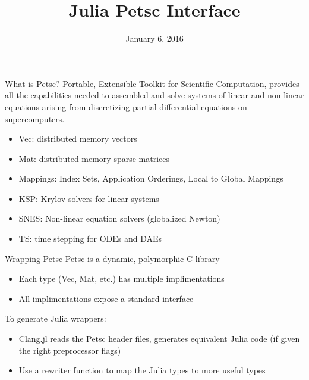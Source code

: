 \documentclass{beamer}
\title{Julia Petsc Interface}
\date{January 6, 2016}
\begin{document}
\begin{frame}
\titlepage
\end{frame}

\begin{frame}{What is Petsc?}
Portable, Extensible Toolkit for Scientific Computation, provides all the 
capabilities needed to assembled and solve systems of linear and non-linear 
equations
arising from discretizing partial differential equations on supercomputers.
\begin{itemize}
  \item Vec: distributed memory vectors
  \item Mat: distributed memory sparse matrices
  \item Mappings: Index Sets, Application Orderings, Local to Global Mappings
  \item KSP: Krylov solvers for linear systems
  \item SNES: Non-linear equation solvers (globalized Newton)
  \item TS: time stepping for ODEs and DAEs
\end{itemize}
\end{frame}


\begin{frame}{Wrapping Petsc}
Petsc is a dynamic, polymorphic C library 
\begin{itemize}
  \item Each type (Vec, Mat, etc.) has multiple implimentations
  \item All implimentations expose a standard interface
\end{itemize}
\hfill

To generate Julia wrappers:
\begin{itemize}
  \item Clang.jl reads the Petsc header files, generates equivalent Julia code (if given the right preprocessor flags)
  \item Use a rewriter function to map the Julia types to more useful types
\end{itemize}

\end{frame}
\end{document}
